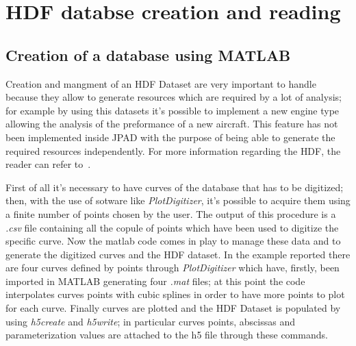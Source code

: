 %
%
\chapter{HDF databse creation and reading }
\label{ch:hdf}
%
\section{Creation of a database using MATLAB}\label{par:Appendix1}
Creation and mangment of an HDF Dataset are very important to handle because they allow to generate resources which are required by a lot of analysis; for example by using this datasets it's possible to implement a new engine type allowing the analysis of the preformance of a new aircraft. 
This feature has not been implemented inside JPAD with the purpose of being able to generate the required resources independently.
%
For more information regarding the \gls{HDF}, the reader can refer to~\cite{hdf}.

\bigskip
\noindent
First of all it's necessary to have curves of the database that has to be digitized; then, with the use of sotware like \emph{PlotDigitizer}, it's possible to acquire them using a finite number of points chosen by the user.
The output of this procedure is a \emph{.csv} file containing all the copule of points which have been used to digitize the specific curve.
%
Now the matlab code comes in play to manage these data and to generate the digitized curves and the HDF dataset. 
In the example reported there are four curves defined by points through \emph{PlotDigitizer} which have, firstly, been imported in MATLAB generating four \emph{.mat} files; at this point the code interpolates curves points with cubic splines in order to have more points to plot for each curve.
%
Finally curves are plotted and the HDF Dataset is populated by using \emph{h5create} and \emph{h5write}; in particular curves points, abscissas and parameterization values are attached to the h5 file through these commands.

